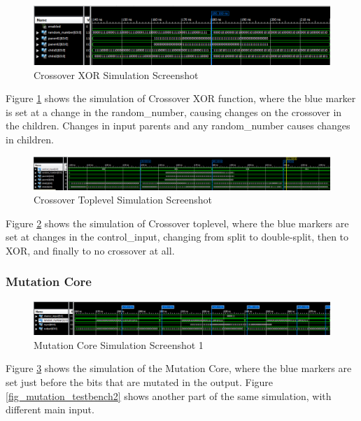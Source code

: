 \begin{figure}[H]
\includegraphics[width=\textwidth]{fpga/fig/testbenches/crossover_xor_simulation1.png}
\caption{Crossover XOR Simulation Screenshot}
\label{fig_crossover_xor_testbench}
\end{figure}

Figure \ref{fig_crossover_xor_testbench} shows the simulation of Crossover XOR function, where the blue marker is set at a change in the random\_number, causing changes on the crossover in the children.
Changes in input parents and any random\_number causes changes in children. 

\begin{figure}[H]
\includegraphics[width=\textwidth]{fpga/fig/testbenches/crossover_toplevel_testbench.png}
\caption{Crossover Toplevel Simulation Screenshot}
\label{fig_crossover_toplevel_testbench}
\end{figure}

Figure \ref{fig_crossover_toplevel_testbench} shows the simulation of Crossover toplevel, where the blue markers are set at changes in the control\_input, changing from split to double-split, then to XOR, and finally to no crossover at all.

\subsubsection{Mutation Core}
\begin{figure}[H]
\includegraphics[width=\textwidth]{fpga/fig/testbenches/mutation_simulation1.png}
\caption{Mutation Core Simulation Screenshot 1}
\label{fig_mutation_testbench1}
\end{figure}

Figure \ref{fig_mutation_testbench1} shows the simulation of the Mutation Core, where the blue markers are set just before the bits that are mutated in the output.
Figure \ref{fig_mutation_testbench2} shows another part of the same simulation, with different main input.

